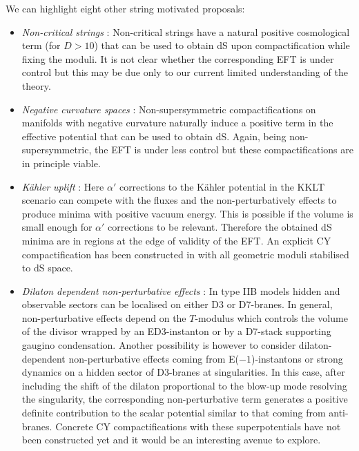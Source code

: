 \documentclass[11pt,a4paper]{article}
\begin{document}
We can highlight eight other string motivated proposals:
\begin{itemize}

\item {\it Non-critical strings} \cite{Maloney:2002rr}: Non-critical strings have a natural positive cosmological term (for $D>10$) that can be used to obtain dS upon compactification while fixing the moduli. It is not clear whether the corresponding EFT is  under control but this may be due only to our current limited understanding of the theory.

\item {\it Negative curvature spaces} \cite{Silverstein:2007ac}: Non-supersymmetric compactifications on manifolds with negative curvature naturally induce a positive term in the effective potential that can be used to obtain dS. Again, being non-supersymmetric, the EFT is under less control but these compactifications are in principle viable.

\item {\it K\"ahler uplift} \cite{Westphal:2006tn, deAlwis:2011dp, Rummel:2011cd}: Here $\alpha'$ corrections to the K\"ahler potential in the KKLT scenario can compete with the fluxes and the non-perturbatively effects to produce minima with positive vacuum energy. This is possible if the volume is small enough for $\alpha'$ corrections to be relevant. Therefore the obtained dS minima are in regions at the edge of validity of the EFT. An explicit CY compactification has been constructed in \cite{Louis:2012nb} with all geometric moduli stabilised to dS space.

\item {\it Dilaton dependent non-perturbative effects} \cite{Cicoli:2012fh}: In type IIB models hidden and observable sectors can be localised on either D3 or D7-branes. In general, non-perturbative effects depend on the $T$-modulus which controls the volume of the divisor wrapped by an ED3-instanton or by a D7-stack supporting gaugino condensation. Another possibility is however to consider dilaton-dependent non-perturbative effects coming from E($-1$)-instantons or strong dynamics on a hidden sector of D3-branes at singularities. In this case, after including the shift of the dilaton proportional to the blow-up mode resolving the singularity, the corresponding non-perturbative term generates a positive definite contribution to the scalar potential similar to that coming from anti-branes. Concrete CY compactifications with these superpotentials have not been constructed yet and it would be an interesting avenue to explore.


\end{itemize}
\end{document}
